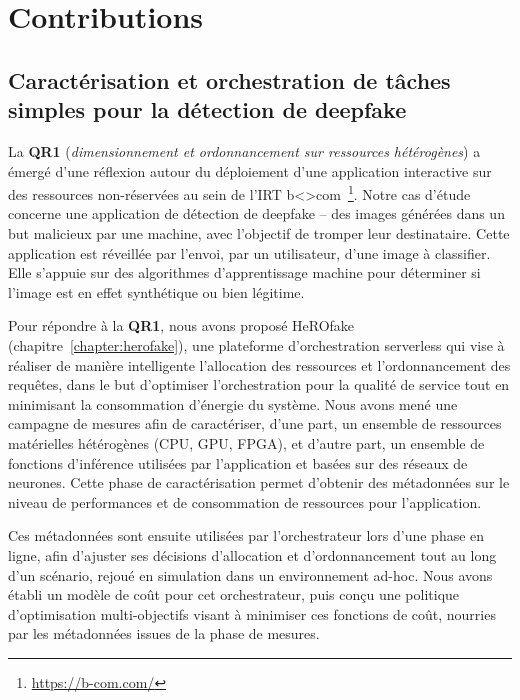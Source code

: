 
\section{Contributions}

\subsection{Caractérisation et orchestration de tâches simples pour la détection de deepfake}

La \textbf{QR1} (\textit{dimensionnement et ordonnancement sur ressources hétérogènes}) a émergé d'une réflexion autour du déploiement d'une application interactive sur des ressources non-réservées au sein de l'IRT b{\textless\textgreater}com~\footnote{\href{https://b-com.com/}{https://b-com.com/}}. Notre cas d'étude concerne une application de détection de deepfake -- des images générées dans un but malicieux par une machine, avec l'objectif de tromper leur destinataire. Cette application est réveillée par l'envoi, par un utilisateur, d'une image à classifier. Elle s'appuie sur des algorithmes d'apprentissage machine pour déterminer si l'image est en effet synthétique ou bien légitime.

Pour répondre à la \textbf{QR1}, nous avons proposé HeROfake (chapitre~\ref{chapter:herofake}), une plateforme d'orchestration serverless qui vise à réaliser de manière intelligente l'allocation des ressources et l'ordonnancement des requêtes, dans le but d'optimiser l'orchestration pour la qualité de service tout en minimisant la consommation d'énergie du système. Nous avons mené une campagne de mesures afin de caractériser, d'une part, un ensemble de ressources matérielles hétérogènes (CPU, GPU, FPGA), et d'autre part, un ensemble de fonctions d'inférence utilisées par l'application et basées sur des réseaux de neurones. Cette phase de caractérisation permet d'obtenir des métadonnées sur le niveau de performances et de consommation de ressources pour l'application.

Ces métadonnées sont ensuite utilisées par l'orchestrateur lors d'une phase en ligne, afin d'ajuster ses décisions d'allocation et d'ordonnancement tout au long d'un scénario, rejoué en simulation dans un environnement ad-hoc. Nous avons établi un modèle de coût pour cet orchestrateur, puis conçu une politique d'optimisation multi-objectifs visant à minimiser ces fonctions de coût, nourries par les métadonnées issues de la phase de mesures.

